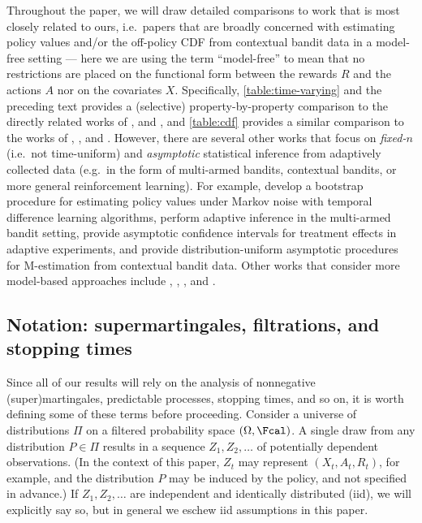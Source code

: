 Throughout the paper, we will draw detailed comparisons to work that is most closely related to ours, i.e.~papers that are broadly concerned with estimating policy values and/or the off-policy CDF from contextual bandit data in a model-free setting --- here we are using the term ``model-free'' to mean that no restrictions are placed on the functional form between the rewards $R$ and the actions $A$ nor on the covariates $X$. Specifically, \cref{table:time-varying} and the preceding text provides a (selective) property-by-property comparison to the directly related works of \citet{karampatziakis2021off,bibaut2021post,zhan2021off}, and \citet{howard2018uniform}, and \cref{table:cdf} provides a similar comparison to the works of \citet{howard2022sequential}, \citet{chandak2021universal}, and \citet{huang2021off}. However, there are several other works that focus on \emph{fixed-$n$} (i.e.~not time-uniform) and \emph{asymptotic} statistical inference from adaptively collected data (e.g.~in the form of multi-armed bandits, contextual bandits, or more general reinforcement learning). For example, \citet{ramprasad2022online} develop a bootstrap procedure for estimating policy values under Markov noise with temporal difference learning algorithms, \citet{dimakopoulou2021online} perform adaptive inference in the multi-armed bandit setting, \citet{hadad2021confidence} provide asymptotic confidence intervals for treatment effects in adaptive experiments, and \citet{zhang2021statistical} provide distribution-uniform asymptotic procedures for M-estimation from contextual bandit data. Other works that consider more model-based approaches include  \citet{zhang2020inference}, \citet{khamaru2021near}, \citet{shen2021doubly}, and \citet{chen2021statistical}.

\subsection{Notation: supermartingales, filtrations, and stopping times}

Since all of our results will rely on the analysis of nonnegative (super)martingales, predictable processes, stopping times, and so on, it is worth defining some of these terms before proceeding. Consider a universe of distributions $\Pi$ on a filtered probability space $(\Omega,\Fcal)$. A single draw from any distribution $P \in \Pi$ results in a sequence $Z_1,Z_2,\dots$ of potentially dependent observations. (In the context of this paper, $Z_t$ may represent $(X_t,A_t,R_t)$, for example, and the distribution $P$ may be induced by the policy, and not specified in advance.) If $Z_1, Z_2, \dots$ are independent and identically distributed (iid), we will explicitly say so, but in general we eschew iid assumptions in this paper.

